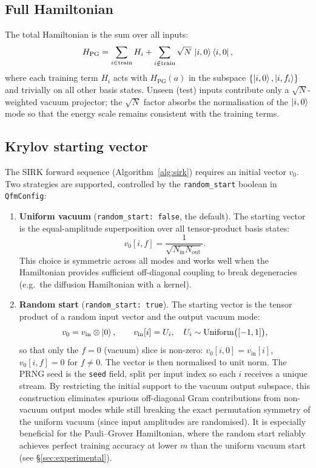 \documentclass[11pt, a4paper]{article}
\begin{document}
\subsection{Full Hamiltonian}

The total Hamiltonian is the sum over all inputs:
\[
H_{\mathrm{PG}} = \sum_{i\in\mathrm{train}} H_i
               + \sum_{i\notin\mathrm{train}} \sqrt{N}\,\ket{i,0}\bra{i,0},
\]
where each training term $H_i$ acts with $H_{\mathrm{PG}}(a)$ in the
subspace $\{\ket{i,0},\ket{i,f_i}\}$ and trivially on all other basis
states.  Unseen (test) inputs contribute only a $\sqrt{N}$-weighted vacuum
projector; the $\sqrt{N}$ factor absorbs the normalisation of the
$\ket{i,0}$ mode so that the energy scale remains consistent with the
training terms.

\subsection{Krylov starting vector}

The SIRK forward sequence (Algorithm~\ref{alg:sirk}) requires an initial
vector $v_0$.  Two strategies are supported, controlled by the
\texttt{random\_start} boolean in \texttt{QfmConfig}:

\begin{enumerate}
  \item \textbf{Uniform vacuum} (\texttt{random\_start: false}, the
    default).  The starting vector is the equal-amplitude superposition over
    all tensor-product basis states:
    \[
    v_0[i,f] = \frac{1}{\sqrt{N_{\mathrm{in}}N_{\mathrm{out}}}}.
    \]
    This choice is symmetric across all modes and works well when the
    Hamiltonian provides sufficient off-diagonal coupling to break
    degeneracies (e.g.\ the diffusion Hamiltonian with a kernel).

  \item \textbf{Random start} (\texttt{random\_start: true}).  The starting
    vector is the tensor product of a random input vector and the output
    vacuum mode:
    \[
    v_0 = v_{\mathrm{in}} \otimes \ket{0},\qquad
    v_{\mathrm{in}}[i] = U_i,\quad
    U_i\sim\mathrm{Uniform}\bigl([-1,1]\bigr),
    \]
    so that only the $f=0$ (vacuum) slice is non-zero:
    $v_0[i,0]=v_{\mathrm{in}}[i]$, $v_0[i,f]=0$ for $f\neq0$.
    The vector is then normalised to unit norm.  The PRNG seed is the
    \texttt{seed} field, split per input index so each $i$ receives a
    unique stream.  By restricting the initial support to the vacuum output
    subspace, this construction eliminates spurious off-diagonal Gram
    contributions from non-vacuum output modes while still breaking the
    exact permutation symmetry of the uniform vacuum (since input
    amplitudes are randomised).  It is especially beneficial for the
    Pauli--Grover Hamiltonian, where the random start reliably achieves
    perfect training accuracy at lower $m$ than the uniform vacuum start
    (see \S\ref{sec:experimental}).
\end{enumerate}
\end{document}
